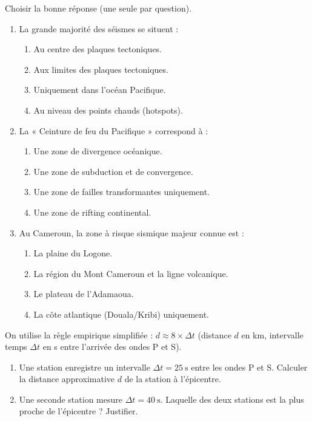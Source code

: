 \documentclass[11pt]{article}
\begin{document}
\begin{exercice}
Choisir la bonne réponse (une seule par question).
\begin{enumerate}
    \item La grande majorité des séismes se situent :
    \begin{enumerate}
        \item Au centre des plaques tectoniques.
        \item Aux limites des plaques tectoniques.
        \item Uniquement dans l'océan Pacifique.
        \item Au niveau des points chauds (hotspots).
    \end{enumerate}
    \item La « Ceinture de feu du Pacifique » correspond à :
    \begin{enumerate}
        \item Une zone de divergence océanique.
        \item Une zone de subduction et de convergence.
        \item Une zone de failles transformantes uniquement.
        \item Une zone de rifting continental.
    \end{enumerate}
    \item Au Cameroun, la zone à risque sismique majeur connue est :
    \begin{enumerate}
        \item La plaine du Logone.
        \item La région du Mont Cameroun et la ligne volcanique.
        \item Le plateau de l'Adamaoua.
        \item La côte atlantique (Douala/Kribi) uniquement.
    \end{enumerate}
\end{enumerate}
\end{exercice}

\begin{exercice}
On utilise la règle empirique simplifiée : $d \approx 8 \times \Delta t$ (distance $d$ en km, intervalle temps $\Delta t$ en s entre l'arrivée des ondes P et S).
\begin{enumerate}
    \item Une station enregistre un intervalle $\Delta t = \SI{25}{\second}$ entre les ondes P et S. Calculer la distance approximative $d$ de la station à l'épicentre.
    \item Une seconde station mesure $\Delta t = \SI{40}{\second}$. Laquelle des deux stations est la plus proche de l'épicentre ? Justifier.
\end{enumerate}
\end{exercice}
\end{document}
